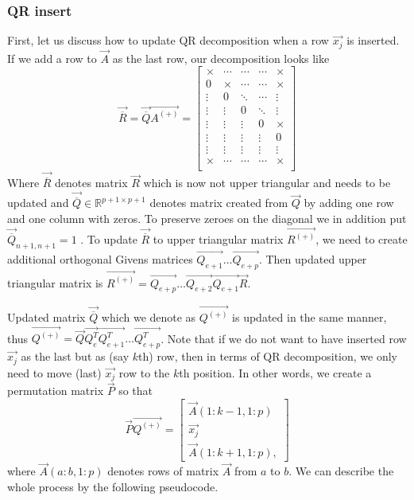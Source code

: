 \subsubsection*{QR insert}
First, let us discuss how to update QR decomposition when a row $\vec{x_j}$ is inserted. 
If we add a row to $\vec{A}$ as the last row, our decomposition looks like
\begin{equation}
    \vec{\overline{R}} =  \vec{\overline{Q}} \vec{A^{(+)}}  = 
    \begin{bmatrix}
        \times & \cdots & \cdots & \cdots & \times \\
        0 &\times & \cdots & \cdots & \times \\
        \vdots& 0&\ddots & \cdots & \vdots \\
        \vdots& \vdots&0 & \ddots &  \vdots \\
        \vdots& \vdots& \vdots& 0& \times \\
        \vdots& \vdots& \vdots& \vdots& 0  \\
        \vdots& \vdots& \vdots& \vdots& \vdots \\
        \times & \cdots & \cdots & \cdots & \times \\
    \end{bmatrix}
\end{equation}
Where $\vec{\overline{R}}$ denotes matrix $\vec{R}$ which is now not upper triangular and needs to be updated and $\vec{\overline{Q}} \in \mathbb{R}^{p+1 \times p+1}$ denotes matrix created from $\vec{Q}$ by adding one row and one column with zeros. To preserve zeroes on the diagonal we in addition put $\vec{\overline{Q}}_{n+1,n+1} = 1$ . 
To update $\vec{\overline{R}}$ to upper triangular matrix $\vec{R^{(+)}}$, we need to create additional orthogonal Givens matrices $\vec{Q_{e+1}}\ldots\vec{Q_{e+p}}$. Then updated upper triangular matrix is
$\vec{R^{(+)}}  =  \vec{Q_{e+p}} \ldots \vec{Q_{e+2}} \vec{Q_{e+1}} \vec{R}$. 

Updated matrix $\vec{\overline{Q}}$ which we denote as $\vec{Q^{(+)}}$
is updated in the same manner, thus $\vec{Q^{(+)}} = \vec{Q}\vec{Q_e^T}\vec{Q_{e+1}^T}\ldots\vec{Q_{e+p}^T}$.
Note that if we do not want to have inserted row $\vec{x_j}$ as the last but as (say $k$th) row, then in terms of QR decomposition, we only need to move (last) $\vec{x_j}$ row to the $k$th position. In other words, we create a permutation  matrix $\vec{P}$ so that 
\begin{equation}
    \vec{P}\vec{Q^{(+)}} = \begin{bmatrix}
        \vec{A}(1:k-1 , 1:p) \\
        \vec{x_j} \\
        \vec{A}(1:k+1 , 1:p), 
    \end{bmatrix}
\end{equation} 
where $\vec{A}(a:b , 1:p) $ denotes rows of matrix $\vec{A}$ from $a$ to $b$.
We can describe the whole process by the following pseudocode. 



